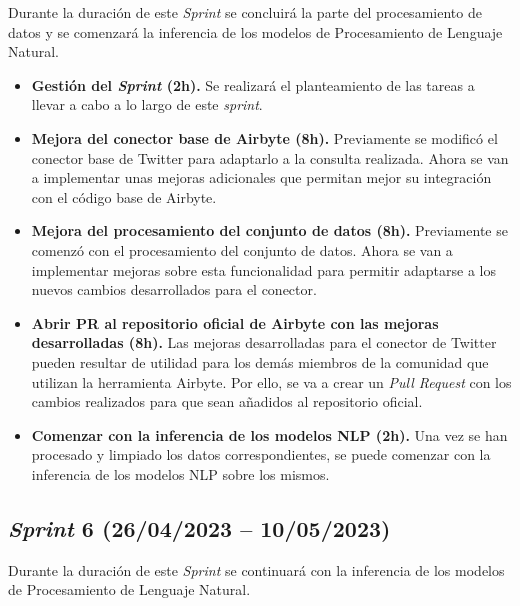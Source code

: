 Durante la duración de este \textit{Sprint} se concluirá la parte del procesamiento de datos y se comenzará la inferencia de los modelos de Procesamiento de Lenguaje Natural.

\begin{itemize}

    \item \textbf{Gestión del \textit{Sprint} (2h).} Se realizará el planteamiento de las tareas a llevar a cabo a lo largo de este \textit{sprint}.

    \item \textbf{Mejora del conector base de Airbyte (8h).} Previamente se modificó el conector base de Twitter para adaptarlo a la consulta realizada. Ahora se van a implementar unas mejoras adicionales que permitan mejor su integración con el código base de Airbyte.

    \item \textbf{Mejora del procesamiento del conjunto de datos (8h).} Previamente se comenzó con el procesamiento del conjunto de datos. Ahora se van a implementar mejoras sobre esta funcionalidad para permitir adaptarse a los nuevos cambios desarrollados para el conector.

    \item \textbf{Abrir PR al repositorio oficial de Airbyte con las mejoras desarrolladas (8h).} Las mejoras desarrolladas para el conector de Twitter pueden resultar de utilidad para los demás miembros de la comunidad que utilizan la herramienta Airbyte. Por ello, se va a crear un \textit{Pull Request} con los cambios realizados para que sean añadidos al repositorio oficial.

    \item \textbf{Comenzar con la inferencia de los modelos NLP (2h).} Una vez se han procesado y limpiado los datos correspondientes, se puede comenzar con la inferencia de los modelos NLP sobre los mismos.

\end{itemize}

\subsection{\textit{Sprint} 6 (26/04/2023 -- 10/05/2023)}

Durante la duración de este \textit{Sprint} se continuará con la inferencia de los modelos de Procesamiento de Lenguaje Natural.

